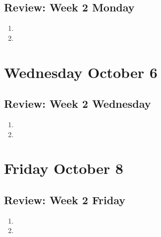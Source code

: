 \documentclass[12pt, oneside]{article}
\begin{document}
\newpage
\subsection*{Review: Week 2 Monday}
\begin{enumerate}
    \item {}
    \item {}
\end{enumerate}
\newpage
\section*{Wednesday October 6}


\newpage


\newpage

\newpage
\subsection*{Review: Week 2 Wednesday}
\begin{enumerate}
    \item {}
    \item {}
\end{enumerate}
\newpage
\section*{Friday October 8}



\newpage

\newpage

\newpage
\subsection*{Review: Week 2 Friday}
\begin{enumerate}
    \item {}
    \item {}
\end{enumerate}
\end{document}
